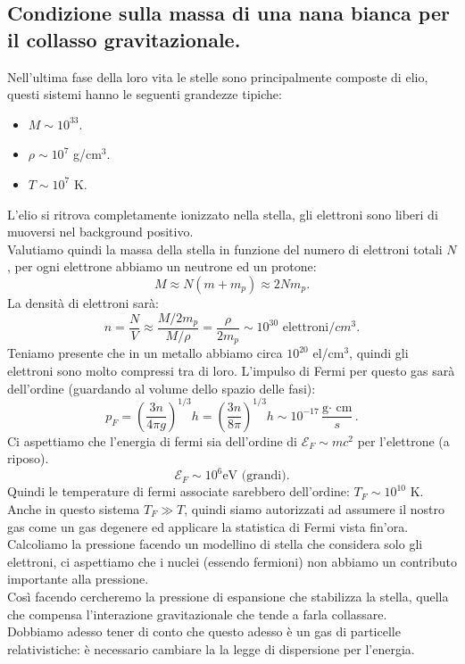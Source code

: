 \subsection{Condizione sulla massa di una nana bianca per il collasso gravitazionale.}%
Nell'ultima fase della loro vita le stelle sono principalmente composte di elio, questi sistemi hanno le seguenti grandezze tipiche:
\begin{itemize}
    \item $M \sim 10^{33}$.
    \item $\rho  \sim 10^7$ g/cm$^3$.
    \item $T\sim 10^7$ K.
\end{itemize}
L'elio si ritrova  completamente ionizzato nella stella, gli elettroni sono liberi di muoversi nel background positivo. \\
Valutiamo quindi la massa della stella in funzione del numero di elettroni totali $N$, per ogni elettrone abbiamo un neutrone ed un protone:
\[
	M \approx N\left( m + m_{p} \right) \approx 2Nm_{p} 
.\] 
La densità di elettroni sarà:
\[
	n = \frac{N}{V} \approx \frac{M /2m_{p}}{M / \rho }= \frac{\rho}{2m_{p}} \sim 10^{30} \text{ elettroni}/cm^3
.\] 
Teniamo presente che in un metallo abbiamo circa $10^{20}$ el/cm$^3$, quindi gli elettroni sono molto compressi tra di loro.
L'impulso di Fermi per questo gas sarà dell'ordine (guardando al volume dello spazio delle fasi):
\[
	p_{F} = \left( \frac{3n}{4\pi g} \right) ^{1 /3} h = \left( \frac{3n}{8\pi} \right) ^{1 /3} h \sim 10^{-17} \frac{\text{g} \cdot \text{ cm}}{s}
.\] 
Ci aspettiamo che l'energia di fermi sia dell'ordine di $\mathcal{E} _{F} \sim  mc^2$ per l'elettrone (a riposo). 
\[
	\mathcal{E} _{F} \sim  10^{6} \text{eV (grandi)}
.\] 
Quindi le temperature di fermi associate sarebbero dell'ordine: $T_{F} \sim 10^{10}$ K.\\
Anche in questo sistema $T_{F} \gg T$, quindi siamo autorizzati ad assumere il nostro gas come un gas degenere ed applicare la statistica di Fermi vista fin'ora.\\
Calcoliamo la pressione facendo un modellino di stella che considera solo gli elettroni, ci aspettiamo che i nuclei (essendo fermioni) non abbiamo un contributo importante alla pressione.\\
Così facendo cercheremo la pressione di espansione che stabilizza la stella, quella che compensa l'interazione gravitazionale che tende a farla collassare.\\
Dobbiamo adesso tener di conto che questo adesso è un gas di particelle relativistiche: è necessario cambiare la la legge di dispersione per l'energia.\\
